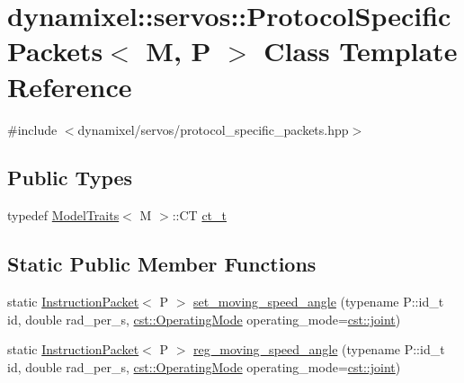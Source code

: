 \hypertarget{classdynamixel_1_1servos_1_1_protocol_specific_packets}{}\section{dynamixel\+:\+:servos\+:\+:Protocol\+Specific\+Packets$<$ M, P $>$ Class Template Reference}
\label{classdynamixel_1_1servos_1_1_protocol_specific_packets}


{\ttfamily \#include $<$dynamixel/servos/protocol\+\_\+specific\+\_\+packets.\+hpp$>$}

\subsection*{Public Types}
\begin{DoxyCompactItemize}
\item 
typedef \hyperlink{structdynamixel_1_1servos_1_1_model_traits}{Model\+Traits}$<$ M $>$\+::CT \hyperlink{classdynamixel_1_1servos_1_1_protocol_specific_packets_a908d795bf5c78a638ed18616f38baf51}{ct\+\_\+t}
\end{DoxyCompactItemize}
\subsection*{Static Public Member Functions}
\begin{DoxyCompactItemize}
\item 
static \hyperlink{classdynamixel_1_1_instruction_packet}{Instruction\+Packet}$<$ P $>$ \hyperlink{classdynamixel_1_1servos_1_1_protocol_specific_packets_a46e78c8b23086c2388b22209f6539dab}{set\+\_\+moving\+\_\+speed\+\_\+angle} (typename P\+::id\+\_\+t id, double rad\+\_\+per\+\_\+s, \hyperlink{namespacedynamixel_1_1servos_1_1cst_ac17b5608f65c6495114d34f8efc4d809}{cst\+::\+Operating\+Mode} operating\+\_\+mode=\hyperlink{namespacedynamixel_1_1servos_1_1cst_ac17b5608f65c6495114d34f8efc4d809a1fdfcfad31f04d24b25c0842e9d99c48}{cst\+::joint})
\item 
static \hyperlink{classdynamixel_1_1_instruction_packet}{Instruction\+Packet}$<$ P $>$ \hyperlink{classdynamixel_1_1servos_1_1_protocol_specific_packets_a92127d3d5f0a6a257bf076266d7f8389}{reg\+\_\+moving\+\_\+speed\+\_\+angle} (typename P\+::id\+\_\+t id, double rad\+\_\+per\+\_\+s, \hyperlink{namespacedynamixel_1_1servos_1_1cst_ac17b5608f65c6495114d34f8efc4d809}{cst\+::\+Operating\+Mode} operating\+\_\+mode=\hyperlink{namespacedynamixel_1_1servos_1_1cst_ac17b5608f65c6495114d34f8efc4d809a1fdfcfad31f04d24b25c0842e9d99c48}{cst\+::joint})
\end{DoxyCompactItemize}


